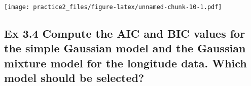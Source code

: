 \documentclass[
]{article}
\newenvironment{Shaded}{\begin{snugshade}}{\end{snugshade}}
\newcommand{\CommentTok}[1]{\textcolor[rgb]{0.56,0.35,0.01}{\textit{#1}}}
\newcommand{\DataTypeTok}[1]{\textcolor[rgb]{0.13,0.29,0.53}{#1}}
\newcommand{\DecValTok}[1]{\textcolor[rgb]{0.00,0.00,0.81}{#1}}
\newcommand{\KeywordTok}[1]{\textcolor[rgb]{0.13,0.29,0.53}{\textbf{#1}}}
\newcommand{\NormalTok}[1]{#1}
\newcommand{\OperatorTok}[1]{\textcolor[rgb]{0.81,0.36,0.00}{\textbf{#1}}}
\newcommand{\OtherTok}[1]{\textcolor[rgb]{0.56,0.35,0.01}{#1}}
\newcommand{\StringTok}[1]{\textcolor[rgb]{0.31,0.60,0.02}{#1}}
\begin{document}
\begin{Shaded}
\end{Shaded}

\texttt{[image: practice2\_files/figure-latex/unnamed-chunk-10-1.pdf]}

\hypertarget{ex-3.4-compute-the-aic-and-bic-values-for-the-simple-gaussian-model-and-the-gaussian-mixture-model-for-the-longitude-data.-which-model-should-be-selected}{%
\subsection{Ex 3.4 Compute the AIC and BIC values for the simple
Gaussian model and the Gaussian mixture model for the longitude data.
Which model should be
selected?}\label{ex-3.4-compute-the-aic-and-bic-values-for-the-simple-gaussian-model-and-the-gaussian-mixture-model-for-the-longitude-data.-which-model-should-be-selected}}

\begin{Shaded}
\end{Shaded}
\end{document}
